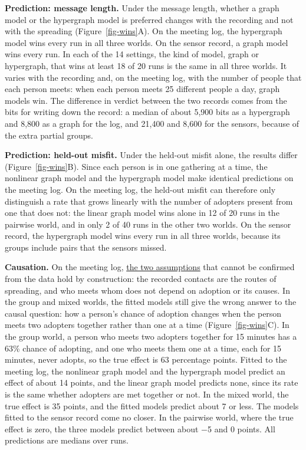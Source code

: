 \documentclass[utf8]{FrontiersinHarvard}
\begin{document}
\textbf{Prediction: message length.} Under the message length, whether a graph model or the hypergraph model is preferred changes with the recording and not with the spreading (Figure~\ref{fig-wins}A). On the meeting log, the hypergraph model wins every run in all three worlds. On the sensor record, a graph model wins every run. In each of the 14 settings, the kind of model, graph or hypergraph, that wins at least 18 of 20 runs is the same in all three worlds. It varies with the recording and, on the meeting log, with the number of people that each person meets: when each person meets 25 different people a day, graph models win. The difference in verdict between the two records comes from the bits for writing down the record: a median of about 5,900 bits as a hypergraph and 8,800 as a graph for the log, and 21,400 and 8,600 for the sensors, because of the extra partial groups.

\textbf{Prediction: held-out misfit.} Under the held-out misfit alone, the results differ (Figure~\ref{fig-wins}B). Since each person is in one gathering at a time, the nonlinear graph model and the hypergraph model make identical predictions on the meeting log. On the meeting log, the held-out misfit can therefore only distinguish a rate that grows linearly with the number of adopters present from one that does not: the linear graph model wins alone in 12 of 20 runs in the pairwise world, and in only 2 of 40 runs in the other two worlds. On the sensor record, the hypergraph model wins every run in all three worlds, because its groups include pairs that the sensors missed.

\textbf{Causation.} On the meeting log, \hyperref[asm-untestable]{the two assumptions} that cannot be confirmed from the data hold by construction: the recorded contacts are the routes of spreading, and who meets whom does not depend on adoption or its causes. In the group and mixed worlds, the fitted models still give the wrong answer to the causal question: how a person's chance of adoption changes when the person meets two adopters together rather than one at a time (Figure~\ref{fig-wins}C). In the group world, a person who meets two adopters together for 15 minutes has a 63\% chance of adopting, and one who meets them one at a time, each for 15 minutes, never adopts, so the true effect is 63 percentage points. Fitted to the meeting log, the nonlinear graph model and the hypergraph model predict an effect of about 14 points, and the linear graph model predicts none, since its rate is the same whether adopters are met together or not. In the mixed world, the true effect is 35 points, and the fitted models predict about 7 or less. The models fitted to the sensor record come no closer. In the pairwise world, where the true effect is zero, the three models predict between about $-$5 and 0 points. All predictions are medians over runs.
\end{document}
